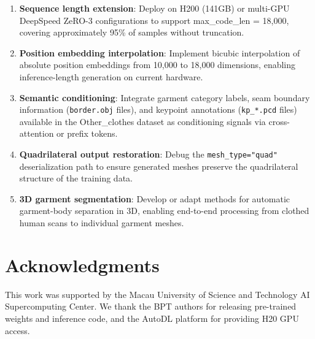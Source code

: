 \documentclass[conference]{IEEEtran}
\begin{document}
\begin{enumerate}
\item \textbf{Sequence length extension}: Deploy on H200 (141GB) or multi-GPU DeepSpeed ZeRO-3 configurations to support max\_code\_len = 18,000, covering approximately 95\% of samples without truncation.
\item \textbf{Position embedding interpolation}: Implement bicubic interpolation of absolute position embeddings from 10,000 to 18,000 dimensions, enabling inference-length generation on current hardware.
\item \textbf{Semantic conditioning}: Integrate garment category labels, seam boundary information (\texttt{border.obj} files), and keypoint annotations (\texttt{kp\_*.pcd} files) available in the Other\_clothes dataset as conditioning signals via cross-attention or prefix tokens.
\item \textbf{Quadrilateral output restoration}: Debug the \texttt{mesh\_type="quad"} deserialization path to ensure generated meshes preserve the quadrilateral structure of the training data.
\item \textbf{3D garment segmentation}: Develop or adapt methods for automatic garment-body separation in 3D, enabling end-to-end processing from clothed human scans to individual garment meshes.
\end{enumerate}

\section*{Acknowledgments}

This work was supported by the Macau University of Science and Technology AI Supercomputing Center.
We thank the BPT authors for releasing pre-trained weights and inference code, and the AutoDL platform for providing H20 GPU access.
\end{document}
